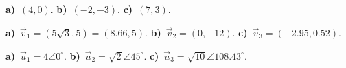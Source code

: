 \begin{EAnswer}{3.1}
\textbf{a)}~$(4,0)$.
					\textbf{b)}~$(-2,-3)$.
					\textbf{c)}~$(7,3)$.
\end{EAnswer}
\begin{EAnswer}{3.2}
\textbf{a)}~$\vec{v}_1=(5\sqrt{3},5)=(8.66,5)$.
					\textbf{b)}~$\vec{v}_2=(0,-12)$.
					\textbf{c)}~$\vec{v}_3=(-2.95,0.52)$.
\end{EAnswer}
\begin{EAnswer}{3.3}
\textbf{a)}~$\vec{u}_1=4\angle 0^\circ$.
					\textbf{b)}~$\vec{u}_2=\sqrt{2}\angle 45^\circ$.
					\textbf{c)}~$\vec{u}_3=\sqrt{10}\angle108.43^\circ$.
\end{EAnswer}
